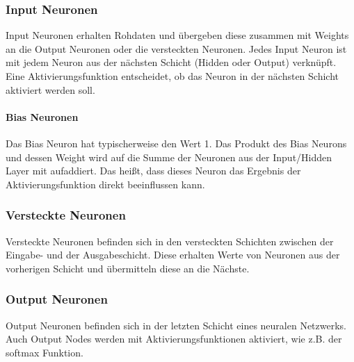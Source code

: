 \subsubsection{Input Neuronen}
Input Neuronen erhalten Rohdaten und übergeben diese zusammen mit Weights an die Output Neuronen oder die versteckten Neuronen. Jedes Input Neuron ist mit jedem Neuron aus der nächsten Schicht 
(Hidden oder Output) verknüpft. Eine Aktivierungsfunktion entscheidet, ob das Neuron in der nächsten Schicht aktiviert werden soll. \cite{CA18}
\paragraph{Bias Neuronen}
Das Bias Neuron hat typischerweise den Wert 1. Das Produkt des Bias Neurons und dessen Weight wird auf die Summe der Neuronen aus der Input/Hidden Layer mit aufaddiert. Das heißt, dass dieses Neuron
das Ergebnis der Aktivierungsfunktion direkt beeinflussen kann. \cite{CA18}
\subsubsection{Versteckte Neuronen}
Versteckte Neuronen befinden sich in den versteckten Schichten zwischen der Eingabe- und der Ausgabeschicht. Diese erhalten Werte von Neuronen aus der vorherigen Schicht und übermitteln diese an die Nächste. \cite{CA18}
\subsubsection{Output Neuronen}
Output Neuronen befinden sich in der letzten Schicht eines neuralen Netzwerks. Auch Output Nodes werden mit Aktivierungsfunktionen aktiviert, wie z.B. der softmax Funktion. \cite{CA18}
